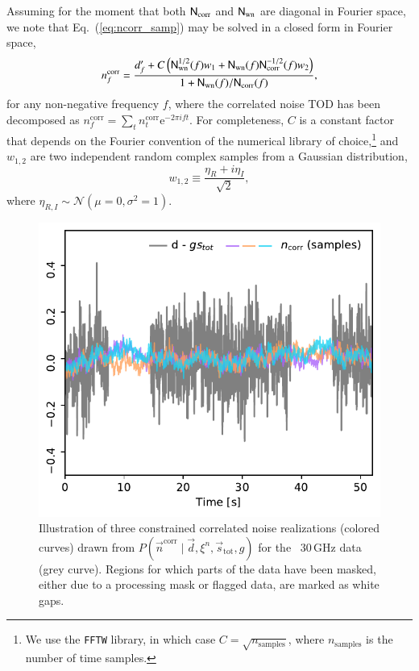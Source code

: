 \documentclass[twocolumn]{aa}
\begin{document}
Assuming for the moment that both $\mathsf{N}_\mathrm{corr}$ and
$\mathsf{N}_\mathrm{wn}$ are diagonal in Fourier space, we note that
Eq.~(\ref{eq:ncorr_samp}) may be solved in a closed form in Fourier
space,
\begin{equation}
  n_f^\mathrm{corr} = \frac{d'_f +
    C\left(\mathsf{N}_\mathrm{wn}^{1/2}(f) w_1 + \mathsf{N}_\mathrm{wn}(f)
    \mathsf{N}_\mathrm{corr}^{-1/2}(f) w_2\right)}{1 +
    \mathsf{N}_\mathrm{wn}(f)/\mathsf{N}_\mathrm{corr}(f)},
  \label{eq:ncorr_fspace}
\end{equation}
for any non-negative frequency $f$, where the correlated noise TOD has
been decomposed as $n^{\mathrm{corr}}_f = \sum_{t} n^{\mathrm{corr}}_t \mathrm
e^{-2\pi ift}$. For
completeness, $C$ is a constant factor that depends on the Fourier
convention of the numerical library of choice,\footnote{We use the
  \texttt{FFTW} library, in which case $C=\sqrt{n_\mathrm{samples}}$, where
  $n_\mathrm{samples}$ is the number of time samples.} and $w_{1,2}$ are two
independent random complex samples from a Gaussian distribution,
\begin{equation}
w_{1,2} \equiv \frac{\eta_R + i \eta_I}{\sqrt{2}},
\end{equation}
where $\eta_{R,I} \sim \mathcal{N}(\mu = 0, \sigma^2 = 1)$.

\begin{figure}
  \begin{center}
    \includegraphics[width=\linewidth]{figs/ncorr_example_030_det_3_13001_mask.pdf}
  \end{center}
  \caption{Illustration of three constrained correlated noise
    realizations (colored curves) drawn from
    $P(\vec{n}^\mathrm{corr}\mid\vec{d}, \xi^n, \vec{s}_\mathrm{tot}, g)$
    for the \Planck\ 30\,GHz data (grey curve). Regions for which parts
    of the data have been masked, either due to a processing mask or
    flagged data, are marked as white gaps. }
  \label{fig:ncorr}
\end{figure}
\end{document}
